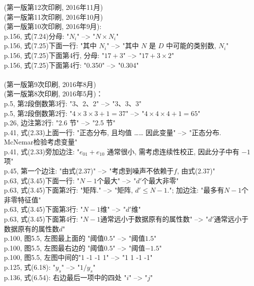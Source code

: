 \documentclass[UTF8]{article}
\begin{document}
\\
\\
\\
\\
\\
(第一版第12次印刷, 2016年11月)
\\
(第一版第11次印刷, 2016年10月)
\\
(第一版第10次印刷, 2016年9月):
\\
p.156, 式(7.24)分母: "$N_i$" --> "$N \times N_i$" \\
p.156, 式(7.25)下面一行: "其中 $N_i$" --> "其中 $N$ 是 $D$ 中可能的类别数, $N_i$" \\
p.156, 式(7.25)下面第4行, 分母: "$17+3$" --> "$17 + 3 \times 2$" \\
p.156, 式(7.25)下面第4行: "0.350" --> "0.304" \\
\\
(第一版第9次印刷, 2016年8月)
\\
(第一版第8次印刷, 2016年5月)：
\\
p.5, 第2段倒数第3行: "3、2、2" --> "3、3、3" \\
p.5, 第2段倒数第2行: "$4 \times 3 \times 3 + 1 = 37$" --> "$4 \times 4 \times 4 + 1 = 65$" \\
p.26, 边注第2行: "2.6 节" --> "2.5 节" \\
p.41, 式(2.33)上面一行: "正态分布, 且均值 …… 因此变量" --> "正态分布. McNemar检验考虑变量" \\
p.41, 式(2.33)旁加边注: "$e_{01} + e_{10}$ 通常很小, 需考虑连续性校正, 因此分子中有 $-1$ 项" \\
p.45, 第一个边注: "由式(2.37)" --> "考虑到噪声不依赖于$f$, 由式(2.37)" \\
p.63, 式(3.45)下面一行: "$N-1$个最大" --> "$d'$个最大非零" \\
p.63, 式(3.45)下面第2行: "矩阵." --> "矩阵, $d'\le N-1$."; 加边注: "最多有$N-1$个非零特征值" \\
p.63, 式(3.45)下面第3行: "$N-1$维" --> "$d'$维" \\
p.63, 式(3.45)下面第4行: "$N-1$通常远小于数据原有的属性数" --> "$d'$通常远小于数据原有的属性数$d$" \\
p.100, 图5.5, 左图最上面的 "阈值$0.5$" --> "阈值$1.5$" \\
p.100, 图5.5, 左图最右边的 "阈值$0.5$" --> "阈值$-1.5$" \\
p.100, 图5.5, 左图中间的"1  -1  -1  1" --> "1  1  -1  -1" \\
p.125, 式(6.18): "$y_s$" --> "$1/y_s$" \\
p.136, 式(6.54): 右边最后一项中的四处 "$i$" --> "$j$" \\
\end{document}
